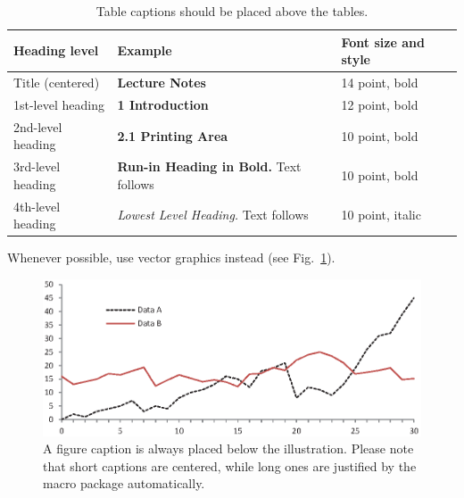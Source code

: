 \documentclass[runningheads]{llncs}
\begin{document}
\begin{table}
\caption{Table captions should be placed above the
tables.}\label{tab1}
\begin{tabular}{|l|l|l|}
\hline
Heading level &  Example & Font size and style\\
\hline
Title (centered) &  {\Large\bfseries Lecture Notes} & 14 point, bold\\
1st-level heading &  {\large\bfseries 1 Introduction} & 12 point, bold\\
2nd-level heading & {\bfseries 2.1 Printing Area} & 10 point, bold\\
3rd-level heading & {\bfseries Run-in Heading in Bold.} Text follows & 10 point, bold\\
4th-level heading & {\itshape Lowest Level Heading.} Text follows & 10 point, italic\\
\hline
\end{tabular}
\end{table}

Whenever possible, use vector graphics instead (see
Fig.~\ref{fig1}).

\begin{figure}
\includegraphics[width=\textwidth]{fig1.eps}
\caption{A figure caption is always placed below the illustration.
Please note that short captions are centered, while long ones are
justified by the macro package automatically.} \label{fig1}
\end{figure}



\end{document}
